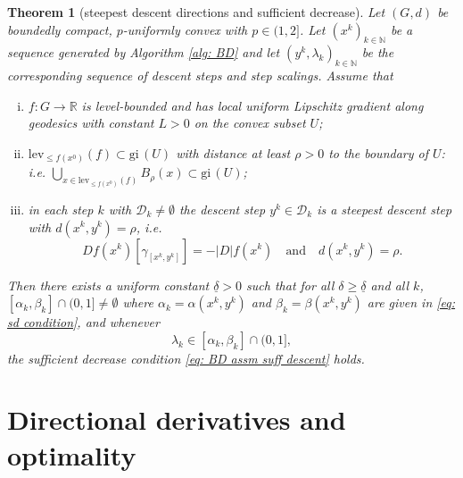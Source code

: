 \documentclass{article}
\theoremstyle{plain}\newtheorem{theorem}{Theorem}[section]
\theoremstyle{plain}\newtheorem{definition}[theorem]{Definition}
\theoremstyle{plain}\newtheorem{lemma}[theorem]{Lemma}
\theoremstyle{definition}\newtheorem{remark}[theorem]{Remark}
\theoremstyle{definition}\newtheorem{example}[theorem]{Example}
\theoremstyle{plain}\newtheorem{proposition}[theorem]{Proposition}
\theoremstyle{plain}\newtheorem{inference}[theorem]{Inference}
\theoremstyle{plain}\newtheorem{corollary}[theorem]{Corollary}
\theoremstyle{plain}\newtheorem{assumption}[theorem]{Assumption}
\newcommand{\bbN}{\mathbb{N}}
\begin{document}
\begin{theorem}[steepest descent directions and sufficient decrease]\label{th:suff descent - suff}
    Let $(G,d)$ be boundedly compact, $p$-uniformly convex with $p\in(1,2]$. Let $(x^k)_{k\in\bbN}$ be a sequence generated by Algorithm \ref{alg: BD} and let $(y^k,\lambda_k)_{k\in\bbN}$ be the corresponding sequence of descent steps and step scalings. Assume that
    \begin{enumerate}[(i)]
        \item $f:G\to\mathbb{R}$ is level-bounded and has local uniform Lipschitz gradient along geodesics with constant $L>0$ on the convex subset $U$;
        \item $\mathrm{lev}_{\leq f(x^0)}(f)\subset \mathrm{gi}\,(U)$ with distance at least $\rho>0$ to the boundary of $U$: i.e. $\bigcup_{x\in \mathrm{lev}_{\leq f(x^0)}(f)} B_\rho(x)\subset \mathrm{gi}\,(U)$;
        \item in each step $k$ with $\mathcal{D}_k\neq\emptyset$ the descent step $y^k\in\mathcal{D}_k$ is a {\em steepest descent step} with $d(x^k,y^k)=\rho$, i.e.
        $$
        Df(x^k)[\gamma_{[x^k,y^k]}]=-|D|f(x^k) \quad\text{and}\quad d(x^k,y^k)=\rho.
        $$
    \end{enumerate}
    Then there exists a uniform constant $\underline{\delta}>0$ such that for all $\delta\geq\underline{\delta}$ and all $k$, $[\alpha_k,\beta_k]\cap(0,1]\neq\emptyset$ where $\alpha_k=\alpha(x^k, y^k)$ and $\beta_k=\beta(x^k, y^k)$ are given in \eqref{eq: sd condition}, and whenever
    \begin{equation}\label{eq: admissable lambda}
        \lambda_k\in [\alpha_k,\beta_k]\cap(0,1],
    \end{equation}
    the {\em sufficient decrease condition} \eqref{eq: BD assm suff descent} holds.
\end{theorem}
\section{Directional derivatives and optimality}\label{sec: dir dervt}
\end{document}
